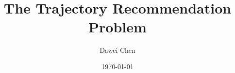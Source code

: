 \documentclass[9pt]{extarticle}
\title{The Trajectory Recommendation Problem}
\author{Dawei Chen}
\date{\today}
\begin{document}
\maketitle

\newcommand{\given}{\mid}
\newcommand{\llb}{\llbracket}
\newcommand{\rrb}{\rrbracket}









%
%
%




\end{document}
